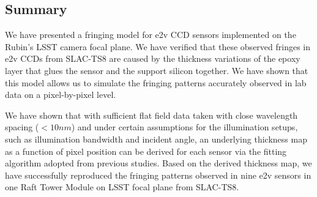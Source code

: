 \documentclass[twocolumn]{aastex63} %
\begin{document}
\begin{CJK*}{UTF8}{gbsn}



\section{Summary}
We have presented a fringing model for e2v CCD sensors implemented on the Rubin's LSST camera focal plane. We have verified that these observed fringes in e2v CCDs from SLAC-TS8 are caused by the thickness variations of the epoxy layer that glues the sensor and the support silicon together. We have shown that this model allows us to simulate the fringing patterns accurately observed in lab data on a pixel-by-pixel level. 

We have shown that with sufficient flat field data taken with close wavelength spacing ($< 10nm$) and under certain assumptions for the illumination setups, such as illumination bandwidth and incident angle, an underlying thickness map as a function of pixel position can be derived for each sensor via the fitting algorithm adopted from previous studies. Based on the derived thickness map, we have successfully reproduced the fringing patterns observed in nine e2v sensors in one Raft Tower Module on LSST focal plane from SLAC-TS8.


\end{CJK*}
\end{document}
